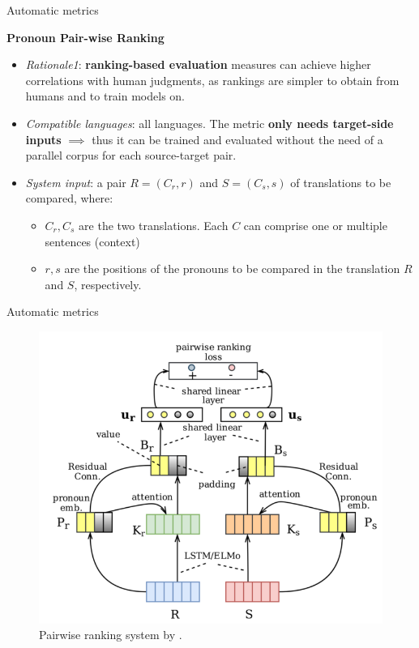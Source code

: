 \begin{frame}{Automatic metrics}
	
\textbf{Pronoun Pair-wise Ranking} \cite{jwalapuram_evaluating_2019}

\begin{itemize}
	\item \textit{Rationale1}: \textbf{ranking-based evaluation} measures can achieve higher correlations with human judgments, as rankings are simpler to obtain from humans and to train models on.
	\item \textit{Compatible languages}: all languages. The metric \textbf{only needs target-side inputs} $\implies$ thus it can be trained and evaluated without the need of a parallel corpus for each source-target pair.
	\item \textit{System input}: a pair $R=(C_r, r)$ and $S=(C_s, s)$ of translations to be compared, where:
	\begin{itemize}
		\item $C_r,C_s$ are the two translations. Each $C$ can comprise one or multiple sentences (context)
		\item $r,s$ are the positions of the pronouns to be compared in the translation $R$ and $S$, respectively.
	\end{itemize} 
\end{itemize}
	
\end{frame}


\begin{frame}{Automatic metrics}
	
\begin{figure}
	\centering
	\includegraphics[width=0.55\linewidth]{Images/jwalapuram_2019_pronoun_ranker}
	\caption{Pairwise ranking system by \cite{jwalapuram_evaluating_2019}.}
	\label{fig:jwalapuram2019pronounranker}
\end{figure}

\end{frame}

